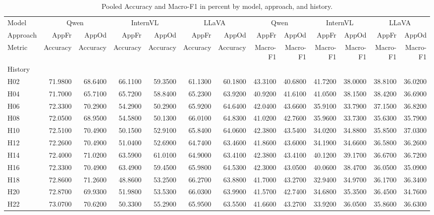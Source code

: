 \begin{table}[tbp]
\caption{Pooled Accuracy and Macro-F1 in percent by model, approach, and history.}
\label{tab:rq1_descriptive_main_percent}
\begin{tabular}{lrrrrrrrrrrrr}
\toprule
Model & \multicolumn{2}{c}{Qwen} & \multicolumn{2}{c}{InternVL} & \multicolumn{2}{c}{LLaVA} & \multicolumn{2}{c}{Qwen} & \multicolumn{2}{c}{InternVL} & \multicolumn{2}{c}{LLaVA} \\
Approach & AppFr & AppOd & AppFr & AppOd & AppFr & AppOd & AppFr & AppOd & AppFr & AppOd & AppFr & AppOd \\
Metric & Accuracy & Accuracy & Accuracy & Accuracy & Accuracy & Accuracy & Macro-F1 & Macro-F1 & Macro-F1 & Macro-F1 & Macro-F1 & Macro-F1 \\
History &  &  &  &  &  &  &  &  &  &  &  &  \\
\midrule
H02 & 71.9800 & 68.6400 & 66.1100 & 59.3500 & 61.1300 & 60.1800 & 43.3100 & 40.6800 & 41.7200 & 38.0000 & 38.8100 & 36.0200 \\
H04 & 71.7000 & 65.7100 & 65.7200 & 58.8400 & 65.2300 & 63.9200 & 40.9200 & 41.6100 & 41.0500 & 38.1500 & 38.4200 & 36.6900 \\
H06 & 72.3300 & 70.2900 & 54.2900 & 50.2900 & 65.9200 & 64.6400 & 42.0400 & 43.6600 & 35.9100 & 33.7900 & 37.1500 & 36.8200 \\
H08 & 72.0500 & 68.9500 & 54.5800 & 50.1300 & 66.0100 & 64.8300 & 41.0200 & 42.7600 & 35.9600 & 33.7300 & 35.6300 & 35.7900 \\
H10 & 72.5100 & 70.4900 & 50.1500 & 52.9100 & 65.8400 & 64.0600 & 42.3800 & 43.5400 & 34.0200 & 34.8800 & 35.8500 & 37.0300 \\
H12 & 72.2600 & 70.4900 & 51.0400 & 52.6900 & 64.7400 & 63.4600 & 41.8600 & 43.6000 & 34.1900 & 34.6600 & 36.5800 & 36.2600 \\
H14 & 72.4000 & 71.0200 & 63.5900 & 61.0100 & 64.9000 & 63.4100 & 42.3800 & 43.4100 & 40.1200 & 39.1700 & 36.6700 & 36.7200 \\
H16 & 72.3300 & 70.4900 & 63.4900 & 59.4500 & 65.9800 & 64.5300 & 42.3000 & 43.0500 & 40.0600 & 38.4700 & 36.0500 & 35.0900 \\
H18 & 72.8600 & 71.2600 & 48.8600 & 53.2500 & 66.2700 & 63.8800 & 41.7000 & 43.2700 & 32.9400 & 34.9700 & 36.1700 & 36.3400 \\
H20 & 72.8700 & 69.9300 & 51.9800 & 53.5300 & 66.0300 & 63.9900 & 41.5700 & 42.7400 & 34.6800 & 35.3500 & 36.4500 & 34.7600 \\
H22 & 73.0700 & 70.6200 & 50.3300 & 55.2900 & 65.9500 & 63.5500 & 41.6600 & 43.2700 & 33.9200 & 36.0500 & 35.8600 & 36.6300 \\

\end{tabular}
\end{table}
